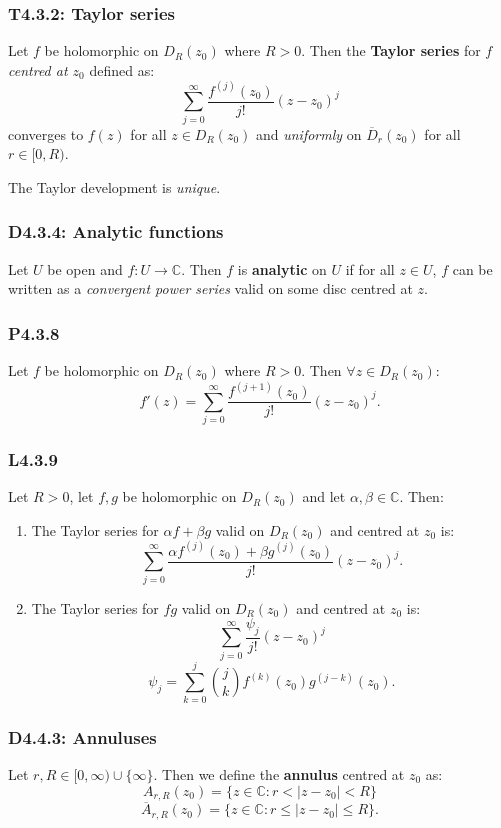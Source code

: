 \documentclass{article}
\begin{document}
\begin{multicols*}{3}
\subsubsection*{T4.3.2: Taylor series}
Let $f$ be holomorphic on $D_R(z_0)$ where $R>0$. Then the
\textbf{Taylor series} for $f$ \textit{centred at $z_0$} defined as:
$$\sum_{j=0}^{\infty}\frac{f^{(j)}(z_0)}{j!}(z-z_0)^j$$
converges to $f(z)$ for all $z\in D_R(z_0)$ and \textit{uniformly}
on $\overline{D}_r(z_0)$ for all $r\in[0,R)$.

The Taylor development is \textit{unique}.

\subsubsection*{D4.3.4: Analytic functions}
Let $U$ be open and $f:U\rightarrow\mathbb{C}$. Then $f$
is \textbf{analytic} on $U$ if for all $z\in U$, $f$ can be written
as a \textit{convergent power series} valid on some disc centred at $z$.

\subsubsection*{P4.3.8}
Let $f$ be holomorphic on $D_R(z_0)$ where $R>0$.
Then $\forall z\in D_R(z_0)$:
$$f'(z)=\sum_{j=0}^{\infty}\frac{f^{(j+1)}(z_0)}{j!}(z-z_0)^j.$$

\subsubsection*{L4.3.9}
Let $R>0$, let $f,g$ be holomorphic on $D_R(z_0)$ and let
$\alpha,\beta\in\mathbb{C}$. Then:
\begin{enumerate}
    \item The Taylor series for $\alpha f+\beta g$ valid on $D_R(z_0)$
    and centred at $z_0$ is:
    $$\sum_{j=0}^{\infty}
    \frac{\alpha f^{(j)}(z_0)+\beta g^{(j)}(z_0)}{j!}(z-z_0)^j.$$

    \item The Taylor series for $fg$ valid on $D_R(z_0)$
    and centred at $z_0$ is:
    $$\sum_{j=0}^{\infty}\frac{\psi_j}{j!}(z-z_0)^j$$
    $$\psi_j=\sum_{k=0}^{j}\binom{j}{k}f^{(k)}(z_0)g^{(j-k)}(z_0).$$
\end{enumerate}

\subsubsection*{D4.4.3: Annuluses}
Let $r,R\in[0,\infty)\cup\{\infty\}$. Then we define the
\textbf{annulus} centred at $z_0$ as:
$$A_{r,R}(z_0)=\{z\in\mathbb{C}:r<|z-z_0|<R\}$$
$$\overline{A}_{r,R}(z_0)=\{z\in\mathbb{C}:r\leq|z-z_0|\leq R\}.$$


\end{multicols*}
\end{document}
